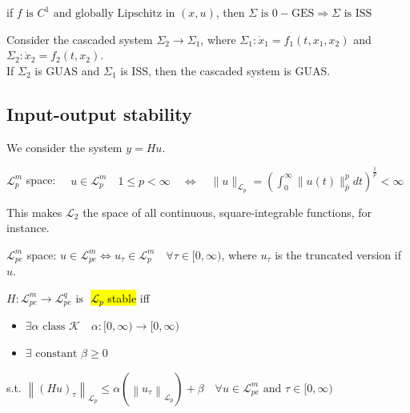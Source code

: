 \begin{lemma}
    if $f \text { is } C^{1} \text { and globally Lipschitz in }(x, u)$, then
    $\Sigma \text { is } 0-\mathrm{GES} \Rightarrow \Sigma \text { is } \mathrm{ISS}$
\end{lemma}

\begin{theorem}
    Consider the cascaded system $\Sigma_{2} \longrightarrow \Sigma_{1}$, where $\Sigma_{1}: \dot{x}_{1}=f_{1}\left(t, x_{1}, x_{2}\right)$ and $\Sigma_{2}: \dot{x}_{2}=f_{2}\left(t, x_{2}\right)$.\\
    If $\Sigma_2$ is GUAS and $\Sigma_1$ is ISS, then the cascaded system is GUAS. 
\end{theorem}

\subsection{Input-output stability}
We consider the system $y=H u$.
\begin{definition}
    $\mathscr{L}_{p}^{m}$ space:
    $\quad u \in \mathscr{L}_{p}^{m} \quad 1 \leq p<\infty \quad \Leftrightarrow \quad\|u\|_{\mathscr{L}_{p}}=\left(\int_{0}^{\infty}\|u(t)\|_{\bar{p}}^{p} d t\right)^{\frac{1}{p}}<\infty$
\end{definition}
\begin{remark}
    This makes $\mathscr{L}_{2}$ the space of all continuous, square-integrable functions, for instance.
\end{remark}
\begin{definition}
    $\mathscr{L}_{pe}^{m}$ space:
    $u \in \mathscr{L}_{p e}^{m} \Leftrightarrow u_{\tau} \in \mathscr{L}_{p}^{m} \quad \forall \tau \in[0, \infty)$, where $u_\tau$ is the truncated version if $u$.
\end{definition}

\begin{tcolorbox}[colback=white, colframe=teal]
\begin{definition}
    $H: \mathscr{L}_{p e}^{m} \rightarrow \mathscr{L}_{p e}^{q} \text { is }$ \hl{$\mathscr{L}_{p}$ stable} iff
    \begin{itemize}[topsep=0pt]
        \item $\exists \alpha \text { class } \mathscr{K} \quad \alpha:[0, \infty) \rightarrow[0, \infty)$
        \item $\exists \text { constant } \beta \geq 0$
    \end{itemize}
    s.t. $\left\|(H u)_{\tau}\right\|_{\mathscr{L}_{p}} \leq \alpha\left(\left\|u_{\tau}\right\|_{\mathscr{L}_{p}}\right)+\beta \quad \forall u \in \mathscr{L}_{p e}^{m} \text { and } \tau \in[0, \infty)$
\end{definition}
\end{tcolorbox}

